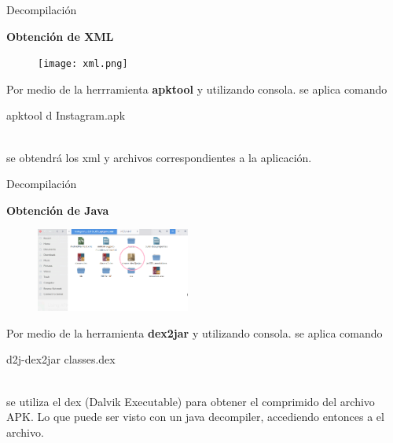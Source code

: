 \begin{frame}[t,fragile]{Decompilación}

\textbf{Obtención de XML}

\begin{figure} 
\vspace{2pt}
  \begin{center}
    \texttt{[image: xml.png]}
    \label{fig:databaseUserTable}
  \end{center}
  \vspace{2pt}
\end{figure} 

\bigskip

 Por medio de la herrramienta \textbf{apktool} y utilizando consola. se aplica comando
\begin{center}
    apktool d Instagram.apk
\end{center}
 \\
 
 se obtendrá los xml y archivos correspondientes a la aplicación.

\end{frame}

\begin{frame}[t,fragile]{Decompilación}

\textbf{Obtención de Java}

\begin{figure} 
\vspace{2pt}
  \begin{center}
    \includegraphics[width=0.45\textwidth]{jarclases.png}
    \label{fig:databaseUserTable}
  \end{center}
  \vspace{2pt}
\end{figure} 

\bigskip

 Por medio de la herramienta \textbf{dex2jar} y utilizando consola. se aplica comando
\begin{center}
    d2j-dex2jar classes.dex
\end{center}
 \\
 
 se utiliza el dex (Dalvik Executable) para obtener el comprimido del archivo APK. Lo que puede ser visto con un java decompiler, accediendo entonces a el archivo.

\end{frame}



